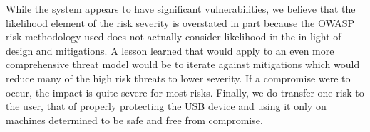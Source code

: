While the system appears to have significant vulnerabilities, we believe that the likelihood element of the risk severity is overstated in part because the OWASP risk methodology used does not actually consider likelihood in the in light of design and mitigations. A lesson learned that would apply to an even more comprehensive threat model would be to iterate against mitigations which would reduce many of the high risk threats to lower severity. If a compromise were to occur, the impact is quite severe for most risks.  Finally, we do transfer  one risk to the user, that of properly protecting the USB device and using it only on machines determined to be safe and free from compromise.
